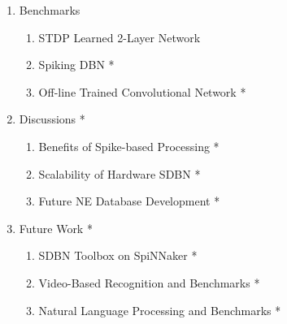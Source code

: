 \documentclass[journal]{journal}
\begin{document}
\begin{appendices}
\begin{enumerate}
\begin{enumerate}
			\end{enumerate}	
		\item Benchmarks
			\begin{enumerate}
				\item STDP Learned 2-Layer Network
				\item Spiking DBN *
				\item Off-line Trained Convolutional Network *
			\end{enumerate}	
		\item Discussions *
			\begin{enumerate}
				\item Benefits of Spike-based Processing *
				\item Scalability of Hardware SDBN *
				\item Future NE Database Development *
			\end{enumerate}					
		\item Future Work *
			\begin{enumerate}
				\item SDBN Toolbox on SpiNNaker *
				\item Video-Based Recognition and Benchmarks *
				\item Natural Language Processing and Benchmarks *
			\end{enumerate}					
	\end{enumerate}	
\end{appendices}
\end{document}
